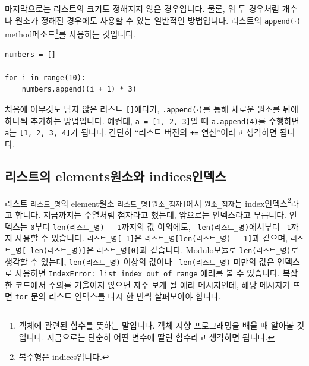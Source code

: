 \documentclass[../main.tex]{subfiles}
\begin{document}
마지막으로는 리스트의 크기도 정해지지 않은 경우입니다.
물론, 위 두 경우처럼 개수나 원소가 정해진 경우에도 사용할 수 있는 일반적인 방법입니다.
리스트의 \texttt{append($\cdot$)} method메소드\footnote{객체에 관련된 함수를 뜻하는 말입니다. 객체 지향 프로그래밍을 배울 때 알아볼 것입니다. 지금으로는 단순히 어떤 변수에 딸린 함수라고 생각하면 됩니다.}를 사용하는 것입니다.
\begin{verbatim}
numbers = []

for i in range(10):
    numbers.append((i + 1) * 3)
\end{verbatim}
처음에 아무것도 담지 않은 리스트 \texttt{[]}에다가, \texttt{.append($\cdot$)}를 통해 새로운 원소를 뒤에 하나씩 추가하는 방법입니다.
예컨대, \texttt{a = [1, 2, 3]}일 때 \texttt{a.append(4)}를 수행하면 \texttt{a}는 \texttt{[1, 2, 3, 4]}가 됩니다.
간단히 ``리스트 버전의 \texttt{+=} 연산''이라고 생각하면 됩니다.

\subsection{리스트의 elements원소와 indices인덱스}
리스트 \texttt{리스트\_명}의 element원소 \texttt{리스트\_명[원소\_첨자]}에서 \texttt{원소\_첨자}는 index인덱스\footnote{복수형은 indices입니다.}라고 합니다.
지금까지는 수열처럼 첨자라고 했는데, 앞으로는 인덱스라고 부릅니다.
인덱스는 \texttt{0}부터 \texttt{len(리스트\_명) - 1}까지의 값 이외에도, \texttt{-len(리스트\_명)}에서부터 \texttt{-1}까지 사용할 수 있습니다.
\texttt{리스트\_명[-1]}은 \texttt{리스트\_명[len(리스트\_명) - 1]}과 같으며, \texttt{리스트\_명[-len(리스트\_명)]}은 \texttt{리스트\_명[0]}과 같습니다.
Modulo모듈로 \texttt{len(리스트\_명)}로 생각할 수 있는데, \texttt{len(리스트\_명)} 이상의 값이나 \texttt{-len(리스트\_명)} 미만의 값은 인덱스로 사용하면 \texttt{IndexError: list index out of range} 에러를 볼 수 있습니다.
복잡한 코드에서 주의를 기울이지 않으면 자주 보게 될 에러 메시지인데, 해당 메시지가 뜨면 \texttt{for} 문의 리스트 인덱스를 다시 한 번씩 살펴보아야 합니다.
\end{document}
